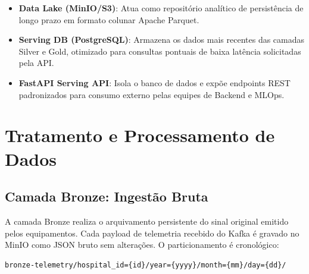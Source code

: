 \documentclass[12pt,a4paper]{article}
\begin{document}
\begin{itemize}
    \item \textbf{Data Lake (MinIO/S3)}: Atua como repositório analítico de persistência de longo prazo em formato colunar Apache Parquet.
    \item \textbf{Serving DB (PostgreSQL)}: Armazena os dados mais recentes das camadas Silver e Gold, otimizado para consultas pontuais de baixa latência solicitadas pela API.
    \item \textbf{FastAPI Serving API}: Isola o banco de dados e expõe endpoints REST padronizados para consumo externo pelas equipes de Backend e MLOps.
\end{itemize}

\newpage

\section{Tratamento e Processamento de Dados}

\subsection{Camada Bronze: Ingestão Bruta}
A camada Bronze realiza o arquivamento persistente do sinal original emitido pelos equipamentos. Cada payload de telemetria recebido do Kafka é gravado no MinIO como JSON bruto sem alterações. O particionamento é cronológico:
\begin{verbatim}
bronze-telemetry/hospital_id={id}/year={yyyy}/month={mm}/day={dd}/
\end{verbatim}
\end{document}
